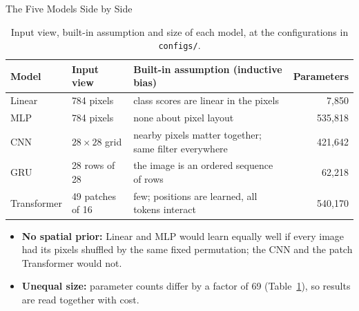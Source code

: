 \begin{frame}{The Five Models Side by Side}
\begin{table}
\centering
\caption{Input view, built-in assumption and size of each model, at the configurations in \texttt{configs/}.}
\label{tab:models}
\small
\begin{tabular}{llp{6.2cm}r}
\toprule
\textbf{Model} & \textbf{Input view} & \textbf{Built-in assumption (inductive bias)} & \textbf{Parameters} \\
\midrule
Linear      & 784 pixels           & class scores are linear in the pixels                 & 7{,}850 \\
MLP         & 784 pixels           & none about pixel layout                               & 535{,}818 \\
CNN         & $28 \times 28$ grid  & nearby pixels matter together; same filter everywhere & 421{,}642 \\
GRU         & 28 rows of 28        & the image is an ordered sequence of rows              & 62{,}218 \\
Transformer & 49 patches of 16     & few; positions are learned, all tokens interact       & 540{,}170 \\
\bottomrule
\end{tabular}
\end{table}

\small
\begin{itemize}
    \item \textbf{No spatial prior:} Linear and MLP would learn equally well if every image had its pixels shuffled by the
          same fixed permutation; the CNN and the patch Transformer would not.
    \item \textbf{Unequal size:} parameter counts differ by a factor of 69 (Table~\ref{tab:models}), so results are read
          together with cost.
\end{itemize}
\end{frame}

